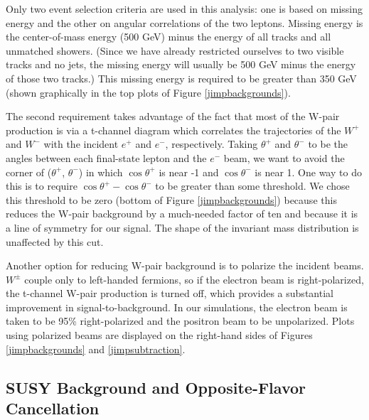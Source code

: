 \documentclass[12pt]{article}
\begin{document}
Only two event selection criteria are used in this analysis: one is
based on missing energy and the other on angular correlations of the
two leptons.  Missing energy is the center-of-mass energy (500 GeV)
minus the energy of all tracks and all unmatched showers.  (Since we
have already restricted ourselves to two visible tracks and no jets,
the missing energy will usually be 500 GeV minus the energy of those
two tracks.)  This missing energy is required to be greater than 350
GeV (shown graphically in the top plots of Figure
\ref{jimpbackgrounds}).

The second requirement takes advantage of the fact that most of the
W-pair production is via a t-channel diagram which correlates the
trajectories of the $W^+$ and $W^-$ with the incident $e^+$ and $e^-$,
respectively.  Taking $\theta^+$ and $\theta^-$ to be the angles
between each final-state lepton and the $e^-$ beam, we want to avoid
the corner of ($\theta^+$, $\theta^-$) in which $\cos\theta^+$ is near
-1 and $\cos\theta^-$ is near 1.  One way to do this is to require
$\cos\theta^+ - \cos\theta^-$ to be greater than some threshold.  We
chose this threshold to be zero (bottom of Figure
\ref{jimpbackgrounds}) because this reduces the W-pair background by a
much-needed factor of ten and because it is a line of symmetry for our
signal.  The shape of the invariant mass distribution is unaffected by
this cut.

Another option for reducing W-pair background is to polarize the
incident beams.  $W^\pm$ couple only to left-handed fermions, so if
the electron beam is right-polarized, the t-channel W-pair production
is turned off, which provides a substantial improvement in
signal-to-background.  In our simulations, the electron beam is taken
to be 95\% right-polarized and the positron beam to be unpolarized.
Plots using polarized beams are displayed on the right-hand sides of
Figures \ref{jimpbackgrounds} and \ref{jimpsubtraction}.

\subsection{SUSY Background and Opposite-Flavor Cancellation}
\end{document}
